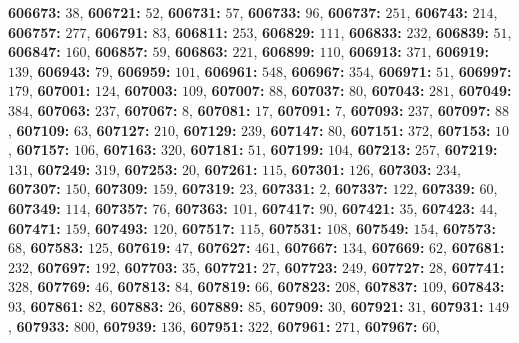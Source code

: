 \textsf{\bfseries 606673:} $38$, \textsf{\bfseries 606721:} $52$, \textsf{\bfseries 606731:} $57$, \textsf{\bfseries 606733:} $96$, \textsf{\bfseries 606737:} $251$, \textsf{\bfseries 606743:} $214$, \textsf{\bfseries 606757:} $277$, \textsf{\bfseries 606791:} $83$, \textsf{\bfseries 606811:} $253$, \textsf{\bfseries 606829:} $111$, \textsf{\bfseries 606833:} $232$, \textsf{\bfseries 606839:} $51$, \textsf{\bfseries 606847:} $160$, \textsf{\bfseries 606857:} $59$, \textsf{\bfseries 606863:} $221$, \textsf{\bfseries 606899:} $110$, \textsf{\bfseries 606913:} $371$, \textsf{\bfseries 606919:} $139$, \textsf{\bfseries 606943:} $79$, \textsf{\bfseries 606959:} $101$, \textsf{\bfseries 606961:} $548$, \textsf{\bfseries 606967:} $354$, \textsf{\bfseries 606971:} $51$, \textsf{\bfseries 606997:} $179$, \textsf{\bfseries 607001:} $124$, \textsf{\bfseries 607003:} $109$, \textsf{\bfseries 607007:} $88$, \textsf{\bfseries 607037:} $80$, \textsf{\bfseries 607043:} $281$, \textsf{\bfseries 607049:} $384$, \textsf{\bfseries 607063:} $237$, \textsf{\bfseries 607067:} $8$, \textsf{\bfseries 607081:} $17$, \textsf{\bfseries 607091:} $7$, \textsf{\bfseries 607093:} $237$, \textsf{\bfseries 607097:} $88$, \textsf{\bfseries 607109:} $63$, \textsf{\bfseries 607127:} $210$, \textsf{\bfseries 607129:} $239$, \textsf{\bfseries 607147:} $80$, \textsf{\bfseries 607151:} $372$, \textsf{\bfseries 607153:} $10$, \textsf{\bfseries 607157:} $106$, \textsf{\bfseries 607163:} $320$, \textsf{\bfseries 607181:} $51$, \textsf{\bfseries 607199:} $104$, \textsf{\bfseries 607213:} $257$, \textsf{\bfseries 607219:} $131$, \textsf{\bfseries 607249:} $319$, \textsf{\bfseries 607253:} $20$, \textsf{\bfseries 607261:} $115$, \textsf{\bfseries 607301:} $126$, \textsf{\bfseries 607303:} $234$, \textsf{\bfseries 607307:} $150$, \textsf{\bfseries 607309:} $159$, \textsf{\bfseries 607319:} $23$, \textsf{\bfseries 607331:} $2$, \textsf{\bfseries 607337:} $122$, \textsf{\bfseries 607339:} $60$, \textsf{\bfseries 607349:} $114$, \textsf{\bfseries 607357:} $76$, \textsf{\bfseries 607363:} $101$, \textsf{\bfseries 607417:} $90$, \textsf{\bfseries 607421:} $35$, \textsf{\bfseries 607423:} $44$, \textsf{\bfseries 607471:} $159$, \textsf{\bfseries 607493:} $120$, \textsf{\bfseries 607517:} $115$, \textsf{\bfseries 607531:} $108$, \textsf{\bfseries 607549:} $154$, \textsf{\bfseries 607573:} $68$, \textsf{\bfseries 607583:} $125$, \textsf{\bfseries 607619:} $47$, \textsf{\bfseries 607627:} $461$, \textsf{\bfseries 607667:} $134$, \textsf{\bfseries 607669:} $62$, \textsf{\bfseries 607681:} $232$, \textsf{\bfseries 607697:} $192$, \textsf{\bfseries 607703:} $35$, \textsf{\bfseries 607721:} $27$, \textsf{\bfseries 607723:} $249$, \textsf{\bfseries 607727:} $28$, \textsf{\bfseries 607741:} $328$, \textsf{\bfseries 607769:} $46$, \textsf{\bfseries 607813:} $84$, \textsf{\bfseries 607819:} $66$, \textsf{\bfseries 607823:} $208$, \textsf{\bfseries 607837:} $109$, \textsf{\bfseries 607843:} $93$, \textsf{\bfseries 607861:} $82$, \textsf{\bfseries 607883:} $26$, \textsf{\bfseries 607889:} $85$, \textsf{\bfseries 607909:} $30$, \textsf{\bfseries 607921:} $31$, \textsf{\bfseries 607931:} $149$, \textsf{\bfseries 607933:} $800$, \textsf{\bfseries 607939:} $136$, \textsf{\bfseries 607951:} $322$, \textsf{\bfseries 607961:} $271$, \textsf{\bfseries 607967:} $60$, 
